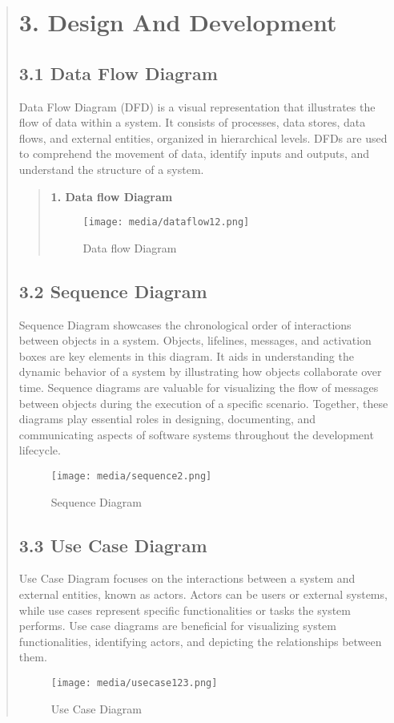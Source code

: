 \documentclass[12pt]{report}
\begin{document}
	
	\begin{quote}
		\section{3. Design And Development}
		
		\subsection{3.1 Data Flow Diagram}
		Data Flow Diagram (DFD) is a visual representation that illustrates the flow of data within a system. It consists of processes, data stores, data flows, and external entities, organized in hierarchical levels. DFDs are used to comprehend the movement of data, identify inputs and outputs, and understand the structure of a system.\\
		
		\begin{quote}
			
			\textbf{1. Data flow Diagram}
			\begin{figure}
				\centering
				\texttt{[image: media/dataflow12.png]}\\
				\caption{Data flow Diagram}
			\end{figure}
			
		\end{quote}
		\clearpage
		
		\subsection{3.2 Sequence Diagram}
		Sequence Diagram showcases the chronological order of interactions between objects in a system. Objects, lifelines, messages, and activation boxes are key elements in this diagram. It aids in understanding the dynamic behavior of a system by illustrating how objects collaborate over time. Sequence diagrams are valuable for visualizing the flow of messages between objects during the execution of a specific scenario. Together, these diagrams play essential roles in designing, documenting, and communicating aspects of software systems throughout the development lifecycle.
		\begin{figure}
			\centering
			\texttt{[image: media/sequence2.png]}\\
			\caption{Sequence Diagram}
		\end{figure}
		\clearpage
		\subsection{3.3 Use Case Diagram}
		Use Case Diagram focuses on the interactions between a system and external entities, known as actors. Actors can be users or external systems, while use cases represent specific functionalities or tasks the system performs. Use case diagrams are beneficial for visualizing system functionalities, identifying actors, and depicting the relationships between them.
		\begin{figure}
			\centering
			\texttt{[image: media/usecase123.png]}\\
			\caption{Use Case Diagram}
		\end{figure}
		\clearpage

\end{quote}
\end{document}
